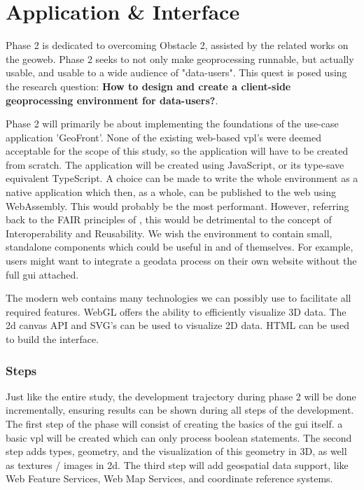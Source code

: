 \section{Application \& Interface}
\label{sec:method-two}

\mySubRQTwo


Phase 2 is dedicated to overcoming Obstacle 2, assisted by the related works on the geoweb. Phase 2 seeks to not only make geoprocessing runnable, but actually usable, and usable to a wide audience of "data-users". This quest is posed using the research question: \textbf{How to design and create a client-side geoprocessing environment for data-users?}. 

Phase 2 will primarily be about implementing the foundations of the use-case application 'GeoFront'. None of the existing web-based \ac{vpl}'s were deemed acceptable for the scope of this study, so the application will have to be created from scratch. 
The application will be created using JavaScript, or its type-save equivalent TypeScript. 
A choice can be made to write the whole environment as a native application which then, as a whole, can be published to the web using WebAssembly. 
This would probably be the most performant. 
However, referring back to the FAIR principles of \cite{mark_d_wilkinson_fair_2016}, this would be detrimental to the concept of Interoperability and Reusability. 
We wish the environment to contain small, standalone components which could be useful in and of themselves. 
For example, users might want to integrate a geodata process on their own website without the full \ac{gui} attached.

The modern web contains many technologies we can possibly use to facilitate all required features. WebGL offers the ability to efficiently visualize 3D data. The 2d canvas API and SVG's can be used to visualize 2D data. HTML can be used to build the interface.

\subsubsection*{Steps}

Just like the entire study, the development trajectory during phase 2 will be done incrementally, ensuring results can be shown during all steps of the development. 
The first step of the phase will consist of creating the basics of the \ac{gui} itself. a basic \ac{vpl} will be created which can only process boolean statements. The second step adds types, geometry, and the visualization of this geometry in 3D, as well as textures / images in 2d. The third step will add geospatial data support, like Web Feature Services, Web Map Services, and coordinate reference systems.  

